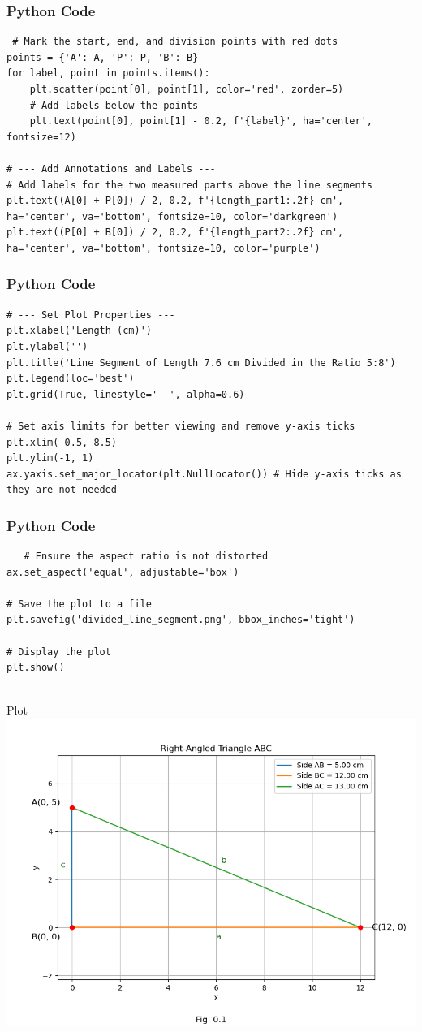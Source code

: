 \documentclass{beamer}
\begin{document}
\begin{frame}[fragile]
    \frametitle{Python Code}
    \begin{lstlisting}
 # Mark the start, end, and division points with red dots
points = {'A': A, 'P': P, 'B': B}
for label, point in points.items():
    plt.scatter(point[0], point[1], color='red', zorder=5)
    # Add labels below the points
    plt.text(point[0], point[1] - 0.2, f'{label}', ha='center', fontsize=12)

# --- Add Annotations and Labels ---
# Add labels for the two measured parts above the line segments
plt.text((A[0] + P[0]) / 2, 0.2, f'{length_part1:.2f} cm', ha='center', va='bottom', fontsize=10, color='darkgreen')
plt.text((P[0] + B[0]) / 2, 0.2, f'{length_part2:.2f} cm', ha='center', va='bottom', fontsize=10, color='purple')

    \end{lstlisting}
\end{frame}
\begin{frame}[fragile]
    \frametitle{Python Code}
    \begin{lstlisting}
# --- Set Plot Properties ---
plt.xlabel('Length (cm)')
plt.ylabel('')
plt.title('Line Segment of Length 7.6 cm Divided in the Ratio 5:8')
plt.legend(loc='best')
plt.grid(True, linestyle='--', alpha=0.6)

# Set axis limits for better viewing and remove y-axis ticks
plt.xlim(-0.5, 8.5)
plt.ylim(-1, 1)
ax.yaxis.set_major_locator(plt.NullLocator()) # Hide y-axis ticks as they are not needed
    \end{lstlisting}
\end{frame}

\begin{frame}[fragile]
    \frametitle{Python Code}
    \begin{lstlisting}
   # Ensure the aspect ratio is not distorted
ax.set_aspect('equal', adjustable='box')

# Save the plot to a file
plt.savefig('divided_line_segment.png', bbox_inches='tight')

# Display the plot
plt.show()


    \end{lstlisting}
\end{frame}

\begin{frame}{Plot}
    \centering
    \includegraphics[width=\columnwidth, height=0.8\textheight, keepaspectratio]{figs/fig1.png}     
\end{frame}
\end{document}
